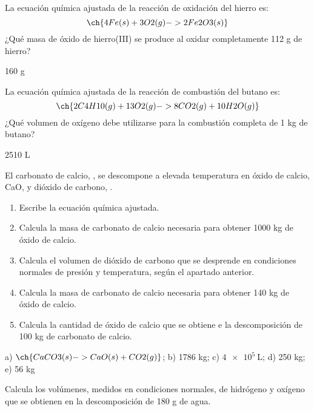 \documentclass[
]{article}
\providecommand{\tightlist}{%
  \setlength{\itemsep}{0pt}\setlength{\parskip}{0pt}}
\begin{document}
\begin{exercise}[tags=OXF16] La ecuación química ajustada de la reacción
de oxidación del hierro es: \[\ch{4 Fe(s) + 3 O2(g) -> 2 Fe2O3(s)}\]
¿Qué masa de óxido de hierro(III) se produce al oxidar completamente 112
g de hierro?\end{exercise}

\begin{solution}160 g\end{solution}

\begin{exercise}[tags=OXF16] La ecuación química ajustada de la reacción
de combustión del butano es:
\[\ch{2 C4H10(g) + 13 O2(g) -> 8 CO2(g) + 10 H2O(g)}\] ¿Qué volumen de
oxígeno debe utilizarse para la combustión completa de 1 kg de
butano?\end{exercise}

\begin{solution}2510 L\end{solution}

\begin{exercise}[tags=OXF16] El carbonato de calcio, , se
descompone a elevada temperatura en óxido de calcio, CaO, y dióxido de
carbono, .

\begin{enumerate}
\def\labelenumi{\alph{enumi})}
\tightlist
\item
  Escribe la ecuación química ajustada.
\item
  Calcula la masa de carbonato de calcio necesaria para obtener 1000 kg
  de óxido de calcio.
\item
  Calcula el volumen de dióxido de carbono que se desprende en
  condiciones normales de presión y temperatura, según el apartado
  anterior.
\item
  Calcula la masa de carbonato de calcio necesaria para obtener 140 kg
  de óxido de calcio.
\item
  Calcula la cantidad de óxido de calcio que se obtiene e la
  descomposición de 100 kg de carbonato de calcio.
\end{enumerate}

\end{exercise}

\begin{solution}a) \(\ch{CaCO3(s) -> CaO(s) + CO2(g)}\); b) 1786 kg; c)
\(\SI{4e5}{\L}\); d) 250 kg; e) 56 kg\end{solution}

\begin{exercise}[tags=OXF16] Calcula los volúmenes, medidos en
condiciones normales, de hidrógeno y oxígeno que se obtienen en la
descomposición de 180 g de agua.\end{exercise}
\end{document}
